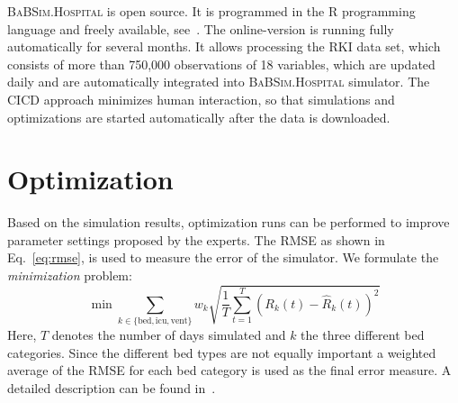 \documentclass[conference]{IEEEtran}
\newcommand{\babsimhospital}{\textsc{BaBSim.Hospital}\xspace}
\begin{document}

\babsimhospital is open source. It is programmed in the R programming language and freely available, see~\cite{bart20t}.
The online-version is running fully automatically for several months.
It allows processing  the \gls{RKI} data set, which consists of more than 
750,000 observations of 18 variables, which are updated daily and are automatically integrated into \babsimhospital simulator. 
The \gls{CICD} approach minimizes human interaction, so that simulations and optimizations are
started automatically after the data is downloaded.

\section{Optimization}\label{sec:optim}
Based on the simulation results, optimization runs can be performed to improve parameter settings proposed by the experts. 
The \gls{RMSE} as shown in Eq.~\ref{eq:rmse}, is used to measure the error of the simulator.
We formulate the \emph{minimization} problem:
\begin{equation}\label{eq:rmse}
  \min 
  \sum_{k\in\{\text{bed},\text{icu},\text{vent}\}}
    w_k  \sqrt{\frac{1}{T} \sum_{t=1}^T \left(R_k(t) - \hat{R}_k(t)\right)^2}
\end{equation}
Here, $T$ denotes the number of days simulated and $k$ the three different bed categories.
Since the different bed types are not equally important a weighted average of the \gls{RMSE} for each bed category is used as the final error measure.
A detailed description can be found in~\cite{Bart20j}.
\end{document}
